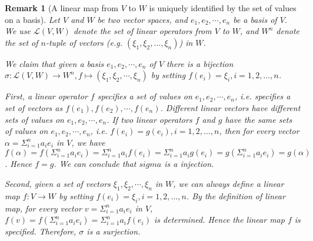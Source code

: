 \documentclass[onecolumn]{ctexart}
\newtheorem{remark}{Remark}
\begin{document}
\begin{remark}[A linear map from $V$ to $W$ is uniquely identified by the set of values on a basis]
  Let $V$ and $W$ be two vector spaces, and $e_1, e_2, \cdots, e_n$ be a basis 
  of $V$. We use $\mathcal{L}(V, W)$ denote the set of linear operators from $V$ 
  to $W$, and $W^n$ denote the set of $n$-tuple of vectors (e.g. $(\xi_1, \xi_2, 
  \ldots, \xi_n)$) in $W$.

  We claim that given a basis $e_1, e_2, \cdots, e_n$ of $V$ there is a bijection 
  $\sigma: \mathcal{L}(V, W) \to W^n, f \mapsto (\xi_1, \xi_2, \cdots, \xi_n)$ 
  by setting $f(e_i) = \xi_i, i = 1,2,\ldots,n$.

  First, a linear operator $f$ specifies a set of values on $e_1, e_2, \cdots, 
  e_n$, i.e. specifies a set of vectors as $f(e_1), f(e_2), \cdots, f(e_n)$. 
  Different linear vectors have different sets of values on $e_1, e_2, \cdots, 
  e_n$. If two linear operators $f$ and $g$ have the same sets of values on $e_1, 
  e_2, \cdots, e_n$, i.e. $f(e_i) = g(e_i), i = 1, 2, \ldots, n$, then for every 
  vector $\alpha = \Sigma_{i=1}^n a_i e_i$ in $V$, we have $f(\alpha) = f(\Sigma_{i=1}^n 
  a_i e_i) = \Sigma_{i=1}^n a_i f(e_i) = \Sigma_{i=1}^n a_i g(e_i) = g(\Sigma_{i=1}^n 
  a_i e_i) = g(\alpha)$. Hence $f = g$. We can conclude that $sigma$ is a injection.

  Second, given a set of vectors $\xi_1, \xi_2, \cdots, \xi_n$ in $W$, we can always 
  define a linear map $f: V \to W$ by setting $f(e_i) = \xi_i, i = 1,2,\ldots,n$. 
  By the definition of linear map, for every vector $v = \Sigma_{i=1}^n a_i e_i$ 
  in $V$, $f(v) = f(\Sigma_{i=1}^n a_i e_i) = \Sigma_{i=1}^n a_i f(e_i)$ is determined. 
  Hence the linear map $f$ is specified. Therefore, $\sigma$ is a surjection.
\end{remark}
\end{document}
